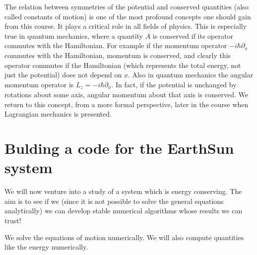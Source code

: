 \documentclass[letterpaper,10pt,english]{sphinxmanual}
\begin{document}
The relation between symmetries of the potential and conserved
quantities (also called constants of motion) is one of the most
profound concepts one should gain from this course. It plays a
critical role in all fields of physics. This is especially true in
quantum mechanics, where a quantity \(A\) is conserved if its operator
commutes with the Hamiltonian. For example if the momentum operator
\(-i\hbar\partial_x\) commutes with the Hamiltonian, momentum is
conserved, and clearly this operator commutes if the Hamiltonian
(which represents the total energy, not just the potential) does not
depend on \(x\). Also in quantum mechanics the angular momentum operator
is \(L_z=-i\hbar\partial_\phi\). In fact, if the potential is unchanged
by rotations about some axis, angular momentum about that axis is
conserved. We return to this concept, from a more formal perspective,
later in the course when Lagrangian mechanics is presented.


\section{Bulding a code for the Earth\sphinxhyphen{}Sun system}
\label{\detokenize{chapter1:bulding-a-code-for-the-earth-sun-system}}
We will now venture into a study of a system which is energy
conserving. The aim is to see if we (since it is not possible to solve
the general equations analytically) we can develop stable numerical
algorithms whose results we can trust!

We solve the equations of motion numerically. We will also compute
quantities like the energy numerically.
\end{document}
